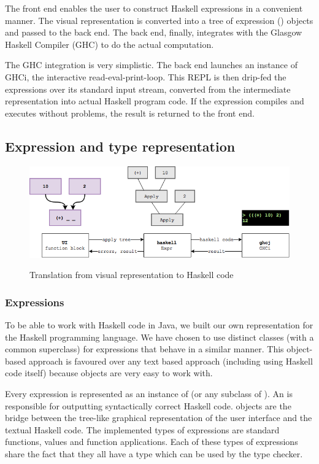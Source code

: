 The front end enables the user to construct Haskell expressions in a convenient manner.
The visual representation is converted into a tree of expression () objects and passed to the back end. 
The back end, finally, integrates with the Glasgow Haskell Compiler (\gls{GHC}) to do the actual computation.

The GHC integration is very simplistic.
The back end launches an instance of GHCi, the interactive read-eval-print-loop. 
This \gls{REPL} is then drip-fed the expressions over its standard input stream, converted from the intermediate representation into actual Haskell program code.
If the expression compiles and executes without problems, the result is returned to the front end.

\subsection{Expression and type representation}

\begin{figure}[h]
	\centering
	\includegraphics[scale=0.5]{Images/exprtohaskell}
	\label{fig:classdiagram-expr}
	\caption{Translation from visual representation to Haskell code}
\end{figure}

\subsubsection{Expressions}
 

To be able to work with Haskell code in Java, we built our own representation for the Haskell programming language.
We have chosen to use distinct classes (with a common superclass) for expressions that behave in a similar manner.
This object-based approach is favoured over any text based approach (including using Haskell code itself) because objects are very easy to work with.

Every expression is represented as an instance of  (or any subclass of ). 
An  is responsible for outputting syntactically correct Haskell code.  objects are the bridge between the tree-like graphical representation of the user interface and the textual Haskell code.
The implemented types of expressions are standard functions, values and function applications.
Each of these types of expressions share the fact that they all have a type which can be used by the type checker.

